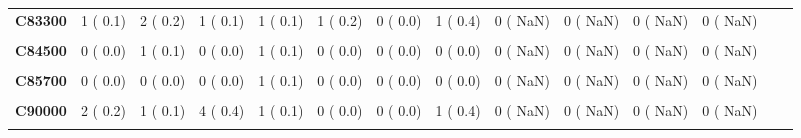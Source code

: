 \documentclass[
]{article}
\begin{document}
\begin{table}[H]
\begin{tabular}[t]{>{\raggedright\arraybackslash}p{5em}ccccccccccccc}
\textbf{C83300} & 1 (  0.1) & 2 (  0.2) & 1 (  0.1) & 1 (  0.1) & 1 (  0.2) & 0 (  0.0) & 1 (  0.4) & 0 (  NaN) & 0 (  NaN) & 0 (  NaN) & 0 (  NaN) &  & \\
\textbf{\cellcolor{gray!10}{C83700}} & \cellcolor{gray!10}{1 (  0.1)} & \cellcolor{gray!10}{0 (  0.0)} & \cellcolor{gray!10}{0 (  0.0)} & \cellcolor{gray!10}{0 (  0.0)} & \cellcolor{gray!10}{0 (  0.0)} & \cellcolor{gray!10}{0 (  0.0)} & \cellcolor{gray!10}{0 (  0.0)} & \cellcolor{gray!10}{0 (  NaN)} & \cellcolor{gray!10}{0 (  NaN)} & \cellcolor{gray!10}{0 (  NaN)} & \cellcolor{gray!10}{0 (  NaN)} & \cellcolor{gray!10}{} & \cellcolor{gray!10}{}\\
\textbf{C84500} & 0 (  0.0) & 1 (  0.1) & 0 (  0.0) & 1 (  0.1) & 0 (  0.0) & 0 (  0.0) & 0 (  0.0) & 0 (  NaN) & 0 (  NaN) & 0 (  NaN) & 0 (  NaN) &  & \\
\textbf{\cellcolor{gray!10}{C85100}} & \cellcolor{gray!10}{1 (  0.1)} & \cellcolor{gray!10}{1 (  0.1)} & \cellcolor{gray!10}{1 (  0.1)} & \cellcolor{gray!10}{0 (  0.0)} & \cellcolor{gray!10}{0 (  0.0)} & \cellcolor{gray!10}{1 (  0.4)} & \cellcolor{gray!10}{0 (  0.0)} & \cellcolor{gray!10}{0 (  NaN)} & \cellcolor{gray!10}{0 (  NaN)} & \cellcolor{gray!10}{0 (  NaN)} & \cellcolor{gray!10}{0 (  NaN)} & \cellcolor{gray!10}{} & \cellcolor{gray!10}{}\\
\textbf{C85700} & 0 (  0.0) & 0 (  0.0) & 0 (  0.0) & 1 (  0.1) & 0 (  0.0) & 0 (  0.0) & 0 (  0.0) & 0 (  NaN) & 0 (  NaN) & 0 (  NaN) & 0 (  NaN) &  & \\
\textbf{\cellcolor{gray!10}{C85900}} & \cellcolor{gray!10}{4 (  0.4)} & \cellcolor{gray!10}{3 (  0.3)} & \cellcolor{gray!10}{2 (  0.2)} & \cellcolor{gray!10}{4 (  0.5)} & \cellcolor{gray!10}{1 (  0.2)} & \cellcolor{gray!10}{1 (  0.4)} & \cellcolor{gray!10}{0 (  0.0)} & \cellcolor{gray!10}{0 (  NaN)} & \cellcolor{gray!10}{0 (  NaN)} & \cellcolor{gray!10}{0 (  NaN)} & \cellcolor{gray!10}{0 (  NaN)} & \cellcolor{gray!10}{} & \cellcolor{gray!10}{}\\
\textbf{C90000} & 2 (  0.2) & 1 (  0.1) & 4 (  0.4) & 1 (  0.1) & 0 (  0.0) & 0 (  0.0) & 1 (  0.4) & 0 (  NaN) & 0 (  NaN) & 0 (  NaN) & 0 (  NaN) &  & \\
\textbf{\cellcolor{gray!10}{C90100}} & \cellcolor{gray!10}{0 (  0.0)} & \cellcolor{gray!10}{1 (  0.1)} & \cellcolor{gray!10}{0 (  0.0)} & \cellcolor{gray!10}{0 (  0.0)} & \cellcolor{gray!10}{0 (  0.0)} & \cellcolor{gray!10}{0 (  0.0)} & \cellcolor{gray!10}{0 (  0.0)} & \cellcolor{gray!10}{0 (  NaN)} & \cellcolor{gray!10}{0 (  NaN)} & \cellcolor{gray!10}{0 (  NaN)} & \cellcolor{gray!10}{0 (  NaN)} & \cellcolor{gray!10}{} & \cellcolor{gray!10}{}\\

\end{tabular}
\end{table}
\end{document}
